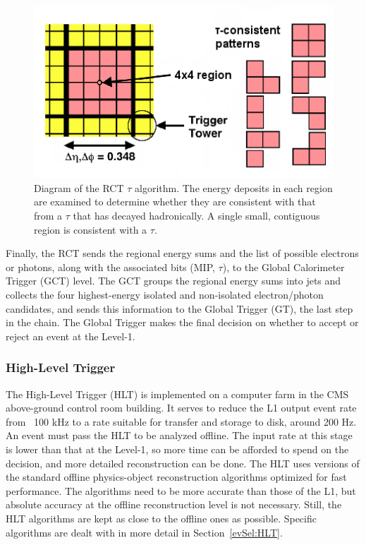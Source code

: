  \begin{figure}[htb]
  \begin{center}
    \includegraphics[width=400pt]{Figures/RCT-tau-algo.png} 
  \end{center}
  \caption[\fixspacing Diagram of the RCT $\tau$ algorithm]{
    \fixspacing Diagram of the RCT $\tau$ algorithm. 
    The energy deposits in each region are 
    examined to determine whether they are 
    consistent with that from a $\tau$ 
    that has decayed hadronically.  
    A single small, contiguous region 
    is consistent with a $\tau$. 
  }
  \label{fig:RctTauAlgo}
 \end{figure}

Finally, the RCT sends the regional energy sums 
and the list of possible 
electrons or photons, 
along with the associated bits (MIP, $\tau$), 
to the 
Global Calorimeter Trigger (GCT) level.  
The GCT groups the regional energy sums into jets 
and collects the four highest-energy isolated and 
non-isolated electron/photon candidates, 
and sends this information to the Global Trigger (GT), 
the last step in the chain.  
The Global Trigger makes the final decision on 
whether to accept or reject an event at the Level-1.  


\subsubsection{High-Level Trigger}
\label{exp:HLT}

The High-Level Trigger (HLT) \cite{hlt-0512077} 
is implemented on a computer farm in the 
CMS above-ground control room building.  
It serves to reduce the L1 output event rate from ~100 kHz to a rate suitable 
for transfer and storage to disk, around 200 Hz.  
An event must pass the HLT to be analyzed offline.  
The input rate at this stage is lower than that at the Level-1, 
so more time can be afforded to spend on the decision, 
and more detailed reconstruction can be done.  
The HLT uses versions of the standard offline physics-object reconstruction algorithms 
optimized for fast performance.  
The algorithms need to be more accurate than those of the L1, 
but absolute accuracy at the offline reconstruction level is not necessary.  
Still, the HLT algorithms are kept as close to the offline ones as possible.  
Specific algorithms are dealt with in more detail in 
Section~\ref{evSel:HLT}.  

